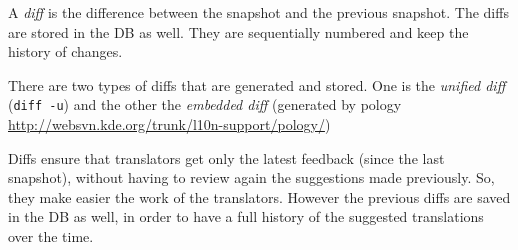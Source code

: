 \documentclass[11pt]{article}
\begin{document}
    A \emph{diff} is the difference between the snapshot and the previous
    snapshot.  The diffs are stored in the DB as well. They are
    sequentially numbered and keep the history of changes.

    There are two types of diffs that are generated and stored. One is
    the \emph{unified diff} (\texttt{diff -u}) and the other the \emph{embedded diff}
    (generated by pology
    \href{http://websvn.kde.org/trunk/l10n-support/pology/}{http://websvn.kde.org/trunk/l10n-support/pology/})

    Diffs ensure that translators get only the latest feedback (since
    the last snapshot), without having to review again the suggestions
    made previously. So, they make easier the work of the translators.
    However the previous diffs are saved in the DB as well, in order to
    have a full history of the suggested translations over the time.
\end{document}
